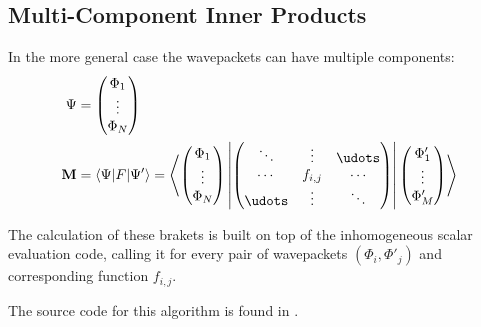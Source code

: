 \subsection{Multi-Component Inner Products}

In the more general case the wavepackets can have multiple components:
\begin{align}
  \Psi &= \begin{pmatrix} \Phi_1 \\ \vdots \\ \Phi_N \end{pmatrix} \\
  \mat{M} &= \langle \Psi | F | \Psi' \rangle = \left\langle
    \begin{pmatrix} \Phi_1 \\ \vdots \\ \Phi_N \end{pmatrix} \left|
    \begin{pmatrix} \ddots & \vdots & \udots \\ \cdots & f_{i,j} & \cdots \\
      \udots & \vdots & \ddots \end{pmatrix} \right|
    \begin{pmatrix} \Phi'_1 \\ \vdots \\ \Phi'_M \end{pmatrix}
    \right\rangle
\end{align}

The calculation of these brakets is built on top of the inhomogeneous scalar
evaluation code, calling it for every pair of wavepackets $(\Phi_i,\Phi'_j)$ and
corresponding function $f_{i,j}$.

The source code for this algorithm is found in
.
